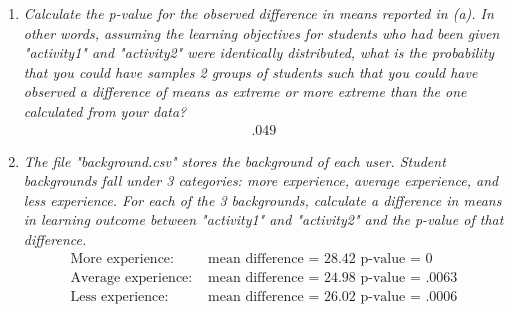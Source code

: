 \documentclass{article} %
\begin{document}
\begin{enumerate}
\begin{enumerate}
	\item \textit{Calculate the p-value for the observed difference in means reported in (a). In other words, assuming the learning objectives for students who had been given "activity1" and "activity2" were identically distributed, what is the probability that you could have samples 2 groups of students such that you could have observed a difference of means as extreme or more extreme than the one calculated from your data?}
	\begin{align*}
	.049
	\end{align*}
	
	\item \textit{The file "background.csv" stores the background of each user. Student backgrounds fall under 3 categories: more experience, average experience, and less experience. For each of the 3 backgrounds, calculate a difference in means in learning outcome between "activity1" and "activity2" and the p-value of that difference.}
	\begin{align*}
	\text{More experience:} &\text{ mean difference = 28.42} \text{ p-value = 0}\\
	\text{Average experience:} &\text{ mean difference = 24.98} \text{ p-value = .0063}\\
	\text{Less experience:} &\text{ mean difference = 26.02} \text{ p-value = .0006}
	\end{align*}
	
	\end{enumerate}

\end{enumerate}
\end{document}
